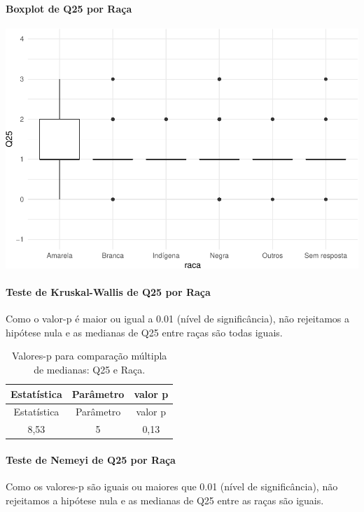 \documentclass[]{article}
\let\oldparagraph\paragraph
\renewcommand{\paragraph}[1]{\oldparagraph{#1}\mbox{}}
\begin{document}
\hypertarget{boxplot-de-q25-por-rauxe7a}{%
\paragraph{Boxplot de Q25 por Raça}\label{boxplot-de-q25-por-rauxe7a}}

\begin{center}\includegraphics[width=0.75\linewidth]{relatorio_covid19_files/figure-latex/unnamed-chunk-697-1} \end{center}

\hypertarget{teste-de-kruskal-wallis-de-q25-por-rauxe7a}{%
\paragraph{Teste de Kruskal-Wallis de Q25 por Raça}\label{teste-de-kruskal-wallis-de-q25-por-rauxe7a}}

Como o valor-p é maior ou igual a 0.01 (nível de significância), não rejeitamos a hipótese nula e as medianas de Q25 entre raças são todas iguais.

\begin{longtable}[]{@{}ccc@{}}
\caption{\label{tab:unnamed-chunk-699}Valores-p para comparação múltipla de medianas: Q25 e Raça.}\tabularnewline
\toprule
Estatística & Parâmetro & valor p\tabularnewline
\midrule
\endfirsthead
\toprule
Estatística & Parâmetro & valor p\tabularnewline
\midrule
\endhead
8,53 & 5 & 0,13\tabularnewline
\bottomrule
\end{longtable}

\hypertarget{teste-de-nemeyi-de-q25-por-rauxe7a}{%
\paragraph{Teste de Nemeyi de Q25 por Raça}\label{teste-de-nemeyi-de-q25-por-rauxe7a}}

Como os valores-p são iguais ou maiores que 0.01 (nível de significância), não rejeitamos a hipótese nula e as medianas de Q25 entre as raças são iguais.
\end{document}
